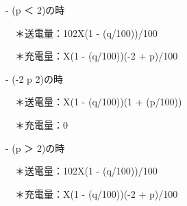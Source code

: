 \documentclass[11pt,a4paper]{jsarticle}
\begin{document}
\begin{flushleft}
　　- (p ＜ 2)の時

　　　＊送電量：102X(1 - (q/100))/100

　　　＊充電量：X(1 - (q/100))(-2 + p)/100
\end{flushleft}

\begin{flushleft}
　　- (-2 \hspace{0.3em}\raisebox{0.4ex}{$<$}\hspace{-0.75em}\raisebox{-.7ex}{=}\hspace{0.3em} p \hspace{0.3em}\raisebox{0.4ex}{$<$}\hspace{-0.75em}\raisebox{-.7ex}{=}\hspace{0.3em} 2)の時

　　　＊送電量：X(1 - (q/100))(1 + (p/100))

　　　＊充電量：0
\end{flushleft}

\begin{flushleft}
　　- (p ＞ 2)の時

　　　＊送電量：102X(1 - (q/100))/100

　　　＊充電量：X(1 - (q/100))(-2 + p)/100

\end{flushleft}


%
%
\end{document}
